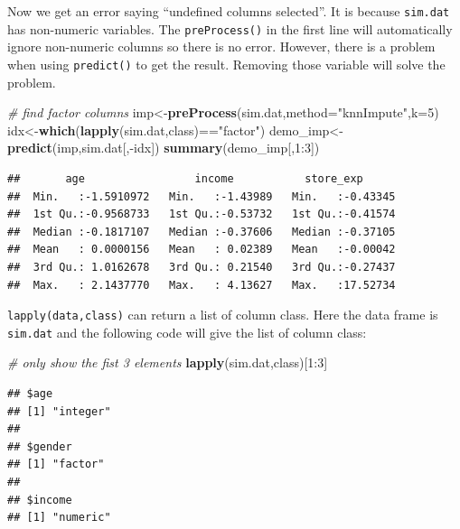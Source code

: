 \documentclass[]{book}
\newenvironment{Shaded}{\begin{snugshade}}{\end{snugshade}}
\newcommand{\KeywordTok}[1]{\textcolor[rgb]{0.13,0.29,0.53}{\textbf{{#1}}}}
\newcommand{\DataTypeTok}[1]{\textcolor[rgb]{0.13,0.29,0.53}{{#1}}}
\newcommand{\DecValTok}[1]{\textcolor[rgb]{0.00,0.00,0.81}{{#1}}}
\newcommand{\StringTok}[1]{\textcolor[rgb]{0.31,0.60,0.02}{{#1}}}
\newcommand{\CommentTok}[1]{\textcolor[rgb]{0.56,0.35,0.01}{\textit{{#1}}}}
\newcommand{\NormalTok}[1]{{#1}}
\theoremstyle{definition}
\theoremstyle{definition}
\theoremstyle{remark}
\begin{document}
Now we get an error saying ``undefined columns selected''. It is because
\texttt{sim.dat} has non-numeric variables. The \texttt{preProcess()} in
the first line will automatically ignore non-numeric columns so there is
no error. However, there is a problem when using \texttt{predict()} to
get the result. Removing those variable will solve the problem.

\begin{Shaded}
\begin{Highlighting}[]
\CommentTok{# find factor columns}
\NormalTok{imp<-}\KeywordTok{preProcess}\NormalTok{(sim.dat,}\DataTypeTok{method=}\StringTok{"knnImpute"}\NormalTok{,}\DataTypeTok{k=}\DecValTok{5}\NormalTok{)}
\NormalTok{idx<-}\KeywordTok{which}\NormalTok{(}\KeywordTok{lapply}\NormalTok{(sim.dat,class)==}\StringTok{"factor"}\NormalTok{)}
\NormalTok{demo_imp<-}\KeywordTok{predict}\NormalTok{(imp,sim.dat[,-idx])}
\KeywordTok{summary}\NormalTok{(demo_imp[,}\DecValTok{1}\NormalTok{:}\DecValTok{3}\NormalTok{])}
\end{Highlighting}
\end{Shaded}

\begin{verbatim}
##       age                 income           store_exp       
##  Min.   :-1.5910972   Min.   :-1.43989   Min.   :-0.43345  
##  1st Qu.:-0.9568733   1st Qu.:-0.53732   1st Qu.:-0.41574  
##  Median :-0.1817107   Median :-0.37606   Median :-0.37105  
##  Mean   : 0.0000156   Mean   : 0.02389   Mean   :-0.00042  
##  3rd Qu.: 1.0162678   3rd Qu.: 0.21540   3rd Qu.:-0.27437  
##  Max.   : 2.1437770   Max.   : 4.13627   Max.   :17.52734
\end{verbatim}

\texttt{lapply(data,class)} can return a list of column class. Here the
data frame is \texttt{sim.dat} and the following code will give the list
of column class:

\begin{Shaded}
\begin{Highlighting}[]
\CommentTok{# only show the fist 3 elements}
\KeywordTok{lapply}\NormalTok{(sim.dat,class)[}\DecValTok{1}\NormalTok{:}\DecValTok{3}\NormalTok{]}
\end{Highlighting}
\end{Shaded}

\begin{verbatim}
## $age
## [1] "integer"
## 
## $gender
## [1] "factor"
## 
## $income
## [1] "numeric"
\end{verbatim}
\end{document}
